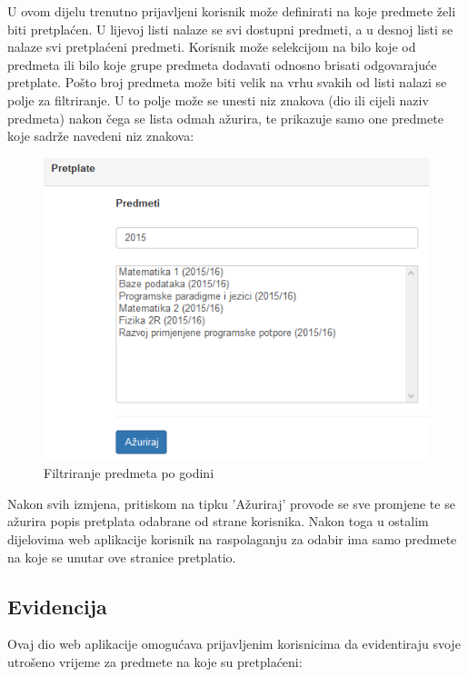 \documentclass[times, utf8, zavrsni, numeric]{fer}
\begin{document}
U ovom dijelu trenutno prijavljeni korisnik može definirati na koje predmete želi biti pretplaćen. U lijevoj listi nalaze se svi dostupni predmeti, a u desnoj listi se nalaze svi pretplaćeni predmeti. Korisnik može selekcijom na bilo koje od predmeta ili bilo koje grupe predmeta dodavati odnosno brisati odgovarajuće pretplate. Pošto broj predmeta može biti velik na vrhu svakih od listi nalazi se polje za filtriranje. U to polje može se unesti niz znakova (dio ili cijeli naziv predmeta) nakon čega se lista odmah ažurira, te prikazuje samo one predmete koje sadrže navedeni niz znakova:

\begin{figure}[H]
\centering
\includegraphics[width=\textwidth,height=\textheight,keepaspectratio]{img/filtriranje.png}
\caption{Filtriranje predmeta po godini}
\label{fig:filtriranje}
\end{figure}

Nakon svih izmjena, pritiskom na tipku 'Ažuriraj' provode se sve promjene te se ažurira popis pretplata odabrane od strane korisnika. Nakon toga u ostalim dijelovima web aplikacije korisnik na raspolaganju za odabir ima samo predmete na koje se unutar ove stranice pretplatio.


\subsection{Evidencija}
Ovaj dio web aplikacije omogućava prijavljenim korisnicima da evidentiraju svoje utrošeno vrijeme za predmete na koje su pretplaćeni:
\end{document}
